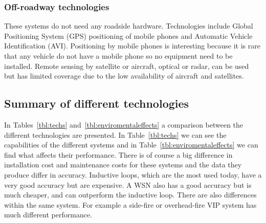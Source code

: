 \subsubsection{Off-roadway technologies}
These systems do not need any roadside hardware. Technologies include Global Positioning System (GPS) positioning of mobile phones and Automatic Vehicle Identification (AVI). Positioning by mobile phones is interesting because it is rare that any vehicle do not have a mobile phone so no equipment need to be installed. Remote sensing by satellite or aircraft, optical or radar, can be used but has limited coverage due to the low availability of aircraft and satellites.

\subsection{Summary of different technologies}
In Tables~\ref{tbl:techs} and~\ref{tbl:enviromentaleffects} a comparison between the different technologies are presented. In Table~\ref{tbl:techs} we can see the capabilities of the different systems and in Table~\ref{tbl:enviromentaleffects} we can find what affects their performance. There is of course a big difference in installation cost and maintenance costs for these systems and the data they produce differ in accuracy. Inductive loops, which are the most used today, have a very good accuracy but are expensive. A WSN also has a good accuracy but is much cheaper, and can outperform the inductive loop. There are also differences within the same system. For example a side-fire or overhead-fire VIP system has much different performance.

